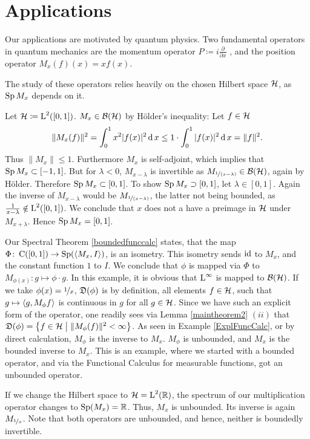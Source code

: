 \section{Applications}

Our applications are motivated by quantum physics. Two fundamental operators
in quantum mechanics are the momentum operator $P\coloneqq 
i \frac{\partial}{\partial x}$
, and the position operator $M_x(f)(x) = xf(x)$. 

\begin{rem}
The study of these operators relies heavily on the chosen Hilbert space $\mathcal{H}$, 
as $\operatorname{Sp} M_x$ depends on it.
\end{rem}
\begin{expl}\label{ExplMult}
 

Let $\mathcal{H} \coloneqq \text{L}^2(\left[ 0, 1 \right])$. $M_x \in \mathcal{B}(\mathcal{H})$ by Hölder's 
inequality: Let $f \in \mathcal{H}$
\[
 \| M_x(f) \|^2 = \int _0 ^1 x^2 | f(x)|^2 \operatorname{d} x \leq 
 1 \cdot \int _0 ^1 | f(x) |^2 \operatorname{d} x = \| f \| ^2.
\]
Thus $\| M_x\| \leq 1$. Furthermore $M_x$ is self-adjoint, which implies that
$\operatorname{Sp} M_x \subset \left[ -1 , 1 \right]$. But for $\lambda < 0$,
$M_{x-\lambda}$ is invertible as $M_{\nicefrac{1}{(x - \lambda)}} \in \mathcal{B}(\mathcal{H})$, again by
Hölder. Therefore $\operatorname{Sp} M_x \subset \left[ 0, 1\right]$. To show 
$\operatorname{Sp} M_x \supset \left[0, 1\right]$, let $\lambda \in  \left[0, 1\right]$.
Again the inverse of $M_{x- \lambda}$ would be $M_{\nicefrac{1}{(x - \lambda)}}$,
the latter not being bounded, as $\frac{1}{x - \lambda} \notin 
\text{L}^2(\left[ 0, 1\right])$. We conclude that $x$ does not a have a preimage
in $\mathcal{H}$ under $M_{x + \lambda}$. Hence $\operatorname{Sp} M_x = \left[ 0 , 1\right]$.

Our Spectral Theorem \ref{boundedfunccalc} states, that the map
$\Phi \colon \operatorname{C}(\left[0, 1\right]) \to \operatorname{Sp} (\left\langle M_x, I \right\rangle)$, is an isometry. This 
isometry sends $\operatorname{id}$ to $M_x$, and the constant function $1$ to $I$.
We conclude that $\phi$ is mapped via $\Phi$ to 
$M_{\phi(x)}\colon g \mapsto \phi \cdot g$. In this example, it is obvious that
$\text{L}^\infty$ is mapped to $\mathcal{B}(\mathcal{H})$. If we take $\phi(x) = \nicefrac{1}{x}$, 
$\mathfrak{D}(\phi)$ is by definition, all elements $f \in \mathcal{H}$, such that
$g \mapsto \left\langle g, M_\phi f \right\rangle$ is continuous in $g$ for all $g \in \mathcal{H}$.
Since we have such an explicit form of the operator, one readily sees via 
Lemma \ref{maintheorem2} $(ii)$ that
$\mathfrak{D}(\phi) = \left\lbrace f \in \mathcal{H} \bigm | \|M_\phi (f)\|^2 < \infty \right\rbrace$.
As seen in Example \ref{ExplFuncCalc}, or by direct calculation, 
$M_\phi$ is the inverse to $M_x$. $M_\phi$ is unbounded, and $M_x$ is 
the bounded inverse to $M_x$. This is an example, where we started with
a bounded operator, and via the Functional Calculus for measurable 
functions, got an unbounded operator.

If we change the Hilbert space to $\mathcal{H} = \text{L}^2 (\mathbb{R})$, the spectrum
of our multiplication operator changes to $\operatorname{Sp}(M_x) = \mathbb{R}$. Thus, $M_x$ 
is unbounded. Its inverse is again $M_{\nicefrac{1}{x}}$. Note that 
both operators are unbounded, and hence, neither is boundedly invertible.
\end{expl}

